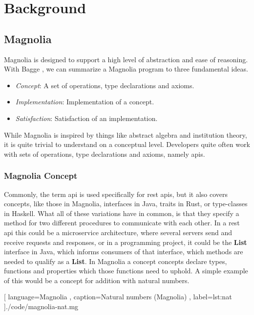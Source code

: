 \chapter{Background} \label{cha:background}

\section{Magnolia}

Magnolia is designed to support a high level of abstraction and ease of
reasoning. With Bagge \cite{baggeThesis}, we can summarize a Magnolia program to
three fundamental ideas.

\begin{itemize}
  \item \textit{Concept}: A set of operations, type declarations and axioms.
  \item \textit{Implementation}: Implementation of a concept.
  \item \textit{Satisfaction}: Satisfaction of an implementation.
\end{itemize}

While Magnolia is inspired by things like abstract algebra and institution
theory, it is quite trivial to understand on a conceptual level. Developers quite
often work with sets of operations, type declarations and axioms, namely
\gls{api}s.

\subsection{Magnolia Concept}

Commonly, the term \gls{api} is used specifically for \gls{rest} \gls{api}s, but
it also covers concepts, like those in Magnolia, interfaces in Java, traits in
Rust, or type-classes in Haskell. What all of these variations have in common, 
is that they specify a method for two different procedures to communicate with 
each other. In a \gls{rest} \gls{api} this could be a microservice architecture,
where several servers send and receive requests and responses, or in a 
programming project, it could be the \textbf{List} interface in Java, which 
informs consumers of that interface, which methods are needed to qualify as a
\textbf{List}. In Magnolia a concept concepts declare types, functions and 
properties which those functions need to uphold. A simple example of this 
would be a concept for addition with natural numbers.

\begin{center}
  
    [ language=Magnolia
    , caption={Natural numbers (Magnolia)}
    , label=lst:nat
    ]{./code/magnolia-nat.mg}
\end{center}

